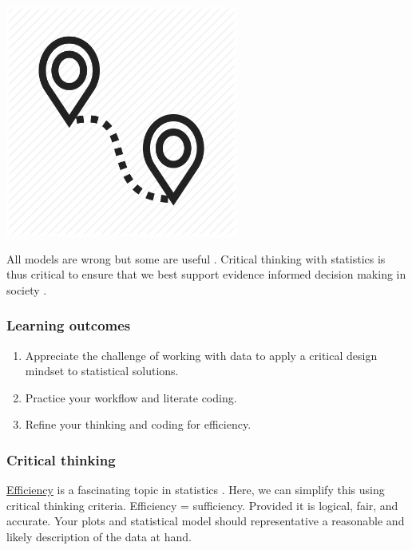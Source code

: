 \documentclass[
]{book}
\providecommand{\tightlist}{%
  \setlength{\itemsep}{0pt}\setlength{\parskip}{0pt}}
\begin{document}
\includegraphics[width=3in,height=\textheight]{./hackathon.png}

All models are wrong but some are useful \citep{RN6467, RN7258}. Critical thinking with statistics is thus critical to ensure that we best support evidence informed decision making in society \citep{RN6861, RN7180}.

\hypertarget{learning-outcomes-5}{%
\subsubsection*{Learning outcomes}\label{learning-outcomes-5}}

\begin{enumerate}
\def\labelenumi{\arabic{enumi}.}
\tightlist
\item
  Appreciate the challenge of working with data to apply a critical design mindset to statistical solutions.\\
\item
  Practice your workflow and literate coding.\\
\item
  Refine your thinking and coding for efficiency.
\end{enumerate}

\hypertarget{critical-thinking-4}{%
\subsubsection*{Critical thinking}\label{critical-thinking-4}}

\href{https://en.wikipedia.org/wiki/Efficiency_(statistics)}{Efficiency} is a fascinating topic in statistics \citep{RN7261, RN7260, RN7259}. Here, we can simplify this using critical thinking criteria. Efficiency = sufficiency. Provided it is logical, fair, and accurate. Your plots and statistical model should representative a reasonable and likely description of the data at hand.
\end{document}
